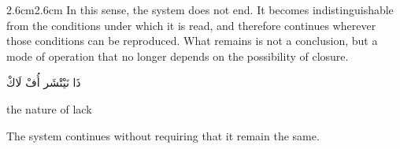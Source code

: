 \begin{adjustwidth}{2.6cm}{2.6cm}
In this sense, the system does not end. It becomes indistinguishable from the
conditions under which it is read, and therefore continues wherever those
conditions can be reproduced. What remains is not a conclusion, but a mode of
operation that no longer depends on the possibility of closure.

\medskip

\begin{AR}
ذَا نَيْتْشَر أُفْ لَاكْ
\end{AR}

\medskip

the nature of lack

\medskip

The system continues without requiring that it remain the same.

\end{adjustwidth}
